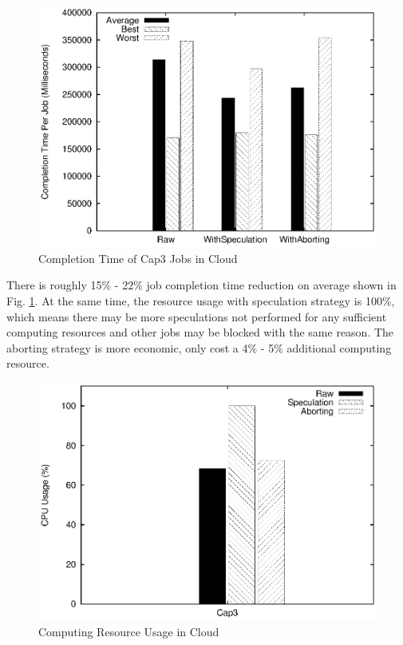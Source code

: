 \begin{figure}
\centering
\includegraphics[width=0.9\columnwidth]{figures/cloud_completiontime_cap3.eps}
\caption{Completion Time of Cap3 Jobs in Cloud}
\label{figure:completiontime_cap3_cloud}
\end{figure}

There is roughly 15\% - 22\% job completion time reduction on average shown in Fig. \ref{figure:completiontime_cap3_cloud}. At the same time, the resource usage with speculation strategy is 100\%, which means there may be more speculations not performed for any sufficient computing resources and other jobs may be blocked with the same reason. The aborting strategy is more economic, only cost a 4\% - 5\% additional computing resource.

\begin{figure}
\centering
\includegraphics[width=0.9\columnwidth]{figures/cloud_resource_usage.eps}
\caption{Computing Resource Usage in Cloud}
\label{figure:resourceusage_cloud}
\end{figure}

